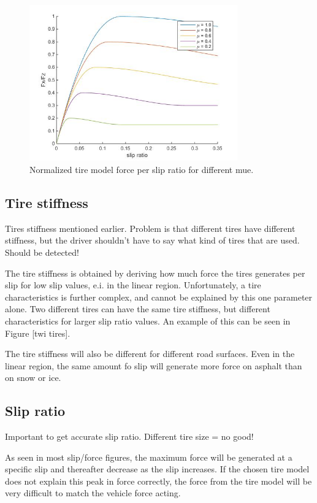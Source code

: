 \begin{figure}[h]
	\centering
	\includegraphics[width=0.8\textwidth]{Pictures/force_per_slip_different_mue}
	\caption {Normalized tire model force per slip ratio for different mue.}
	\label{force/slip}
\end{figure}


\subsection{Tire stiffness}

Tires stiffness mentioned earlier. Problem is that different tires have different stiffness, but the driver shouldn't have to say what kind of tires that are used. Should be detected!

The tire stiffness is obtained by deriving how much force the tires generates per slip for low slip values, e.i. in the linear region. Unfortunately, a tire characteristics is further complex, and cannot be explained by this one parameter alone. Two different tires can have the same tire stiffness, but different characteristics for larger slip ratio values. An example of this can be seen in Figure [twi tires].

The tire stiffness will also be different for different road surfaces. Even in the linear region, the same amount fo slip will generate more force on asphalt than on snow or ice. 

\subsection{Slip ratio}

Important to get accurate slip ratio. Different tire size = no good!

As seen in most slip/force figures, the maximum force will be generated at a specific slip and thereafter decrease as the slip increases. If the chosen tire model does not explain this peak in force correctly, the force from the tire model will be very difficult to match the vehicle force acting. 

